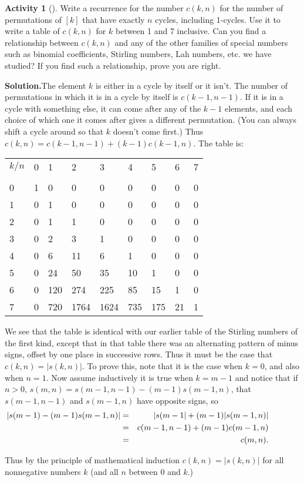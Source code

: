 \documentclass[10pt,]{book}
\theoremstyle{plain}
\theoremstyle{definition}
\newtheorem{activity}[project]{Activity}
\numberwithin{equation}{chapter}
\newcommand{\hrulethin}  {\noalign{\hrule height 0.04em}}
\newcommand{\amp}{&}
\begin{document}
\begin{activity}[]\label{activity-257}
Write a recurrence for the number \(c(k,n)\) for the number of permutations of \([k]\) that have exactly \(n\) cycles, including 1-cycles. Use it to write a table of \(c(k,n)\) for \(k\) between 1 and 7 inclusive. Can you find a relationship between \(c(k,n)\) and any of the other families of special numbers such as binomial coefficients, Stirling numbers, Lah numbers, etc. we have studied? If you find such a relationship, prove you are right.%
\par\medskip\noindent%
\textbf{Solution.}\quad The element \(k\) is either in a cycle by itself or it isn't. The number of permutations in which it is in a cycle by itself is \(c(k-1,n-1)\). If it is in a cycle with something else, it can come after any of the \(k-1\) elements, and each choice of which one it comes after gives a different permutation. (You can always shift a cycle around so that \(k\) doesn't come first.) Thus \(c(k,n) = c(k-1,n-1) + (k-1)c(k-1,n)\). The table is:%
\begin{tabular}{lllllllll}
\(k/n\)&0&1&2&3&4&5&6&7\tabularnewline[0pt]
&&&&&&&&\tabularnewline\hrulethin
0&1&0&0&0&0&0&0&0\tabularnewline[0pt]
1&0&1&0&0&0&0&0&0\tabularnewline[0pt]
2&0&1&1&0&0&0&0&0\tabularnewline[0pt]
3&0&2&3&1&0&0&0&0\tabularnewline[0pt]
4&0&6&11&6&1&0&0&0\tabularnewline[0pt]
5&0&24&50&35&10&1&0&0\tabularnewline[0pt]
6&0&120&274&225&85&15&1&0\tabularnewline[0pt]
7&0&720&1764&1624&735&175&21&1
\end{tabular}
We see that the table is identical with our earlier table of the Stirling numbers of the first kind, except that in that table there was an alternating pattern of minus signs, offset by one place in successive rows. Thus it must be the case that \(c(k,n)=
|s(k,n)|\). To prove this, note that it is the case when \(k=0\), and also when \(n=1\). Now assume inductively it is true when \(k= m-1\) and notice that if \(n>0\), \(s(m,n)=s(m-1,n-1)-(m-1)s(m-1,n)\), that \(s(m-1,n-1)\) and \(s(m-1,n)\) have opposite signs, so%
\begin{align*}
\hspace{-.5in}|s(m-1)-(m-1)s(m-1,n)|\amp =\amp  |s(m-1| +
(m-1)|s(m-1,n)|\\
\amp =\amp c(m-1,n-1)+(m-1)c(m-1,n)\\
\amp =\amp  c(m,n).
\end{align*}
%
\par
Thus by the principle of mathematical induction \(c(k,n) = |s(k,n)|\) for all nonnegative numbers \(k\) (and all \(n\) between 0 and \(k\).)%
\end{activity}
\end{document}
